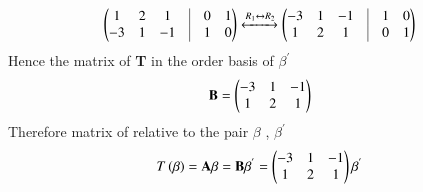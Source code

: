\documentclass[journal,12pt,twocolumn]{IEEEtran}
\begin{document}
\begin{align}
\myvec{1&2&1&\vline&0&1\\-3&1&-1&\vline&1&0}\xleftrightarrow{R_1\leftrightarrow R_2}\myvec{-3&1&-1&\vline&1&0\\1&2&1&\vline&0&1}
\end{align}
Hence the matrix of \textbf{T} in the order basis of $\beta^{'}$
\begin{align}
    \mathbf{B}=\begin{pmatrix}-3&1&-1\\1&2&1\end{pmatrix}
\end{align}
 Therefore matrix of relative to the pair $\beta$ , $\beta^{'}$  
 \begin{align}
  T\left(\mathbf{\beta}\right)=\mathbf{A}\beta = \mathbf{B}\beta^{'}=\begin{pmatrix}-3&1&-1\\1&2&1\end{pmatrix}\mathbf{\beta^{'}}   
 \end{align}
\end{document}
